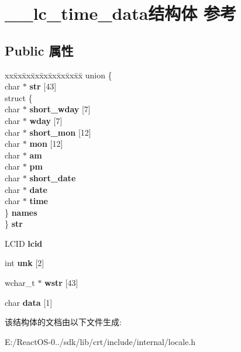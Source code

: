 \hypertarget{struct____lc__time__data}{}\section{\+\_\+\+\_\+lc\+\_\+time\+\_\+data结构体 参考}
\label{struct____lc__time__data}
\subsection*{Public 属性}
\begin{DoxyCompactItemize}
\item 
\mbox{\label{struct____lc__time__data_a0f85c3ebc2edf35ebb8a7d9dbf668b81}} 
\begin{tabbing}
xx\=xx\=xx\=xx\=xx\=xx\=xx\=xx\=xx\=\kill
union \{\\
\>char $\ast$ {\bfseries str} \mbox{[}43\mbox{]}\\
\>struct \{\\
\>\>char $\ast$ {\bfseries short\_wday} \mbox{[}7\mbox{]}\\
\>\>char $\ast$ {\bfseries wday} \mbox{[}7\mbox{]}\\
\>\>char $\ast$ {\bfseries short\_mon} \mbox{[}12\mbox{]}\\
\>\>char $\ast$ {\bfseries mon} \mbox{[}12\mbox{]}\\
\>\>char $\ast$ {\bfseries am}\\
\>\>char $\ast$ {\bfseries pm}\\
\>\>char $\ast$ {\bfseries short\_date}\\
\>\>char $\ast$ {\bfseries date}\\
\>\>char $\ast$ {\bfseries time}\\
\>\} {\bfseries names}\\
\} {\bfseries str}\\

\end{tabbing}\item 
\mbox{\label{struct____lc__time__data_abed66948f5401e2ed9b37f8c862ee802}} 
L\+C\+ID {\bfseries lcid}
\item 
\mbox{\label{struct____lc__time__data_a2224a7c99331683802ac9e26015f07a1}} 
int {\bfseries unk} \mbox{[}2\mbox{]}
\item 
\mbox{\label{struct____lc__time__data_af609eab4e321d35cc920269a618428b6}} 
wchar\+\_\+t $\ast$ {\bfseries wstr} \mbox{[}43\mbox{]}
\item 
\mbox{\label{struct____lc__time__data_abef46edf5cacad9a28523eab97b53e38}} 
char {\bfseries data} \mbox{[}1\mbox{]}
\end{DoxyCompactItemize}


该结构体的文档由以下文件生成\+:\begin{DoxyCompactItemize}
\item 
E\+:/\+React\+O\+S-\/0../sdk/lib/crt/include/internal/locale.\+h\end{DoxyCompactItemize}
